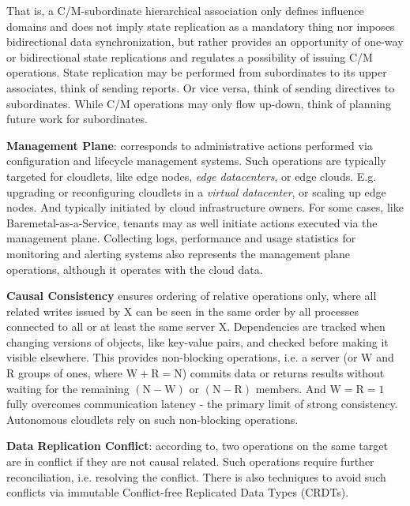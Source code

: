 \documentclass[conference]{IEEEtran}
\begin{document}
That is, a C/M-subordinate hierarchical association only defines influence
domains and does not imply state replication as a mandatory thing nor imposes
bidirectional data synchronization, but rather provides an opportunity of
one-way or bidirectional state replications and regulates a possibility of
issuing C/M operations. State replication may be performed from subordinates to
its upper associates, think of sending reports. Or vice versa, think of sending
directives to subordinates. While C/M operations may only flow up-down, think
of planning future work for subordinates.

\textbf{Management Plane}: corresponds to administrative actions performed via
configuration and lifecycle management systems. Such operations are typically
targeted for cloudlets, like edge nodes, \textit{edge datacenters}\cite{b3},
or edge clouds. E.g. upgrading or reconfiguring cloudlets in a \textit{virtual
datacenter}\cite{b3}, or scaling up edge nodes. And typically initiated by
cloud infrastructure owners. For some cases, like Baremetal-as-a-Service,
tenants may as well initiate actions executed via the management plane.
Collecting logs, performance and usage statistics for monitoring and alerting
systems also represents the management plane operations, although it operates
with the cloud data.

\textbf{Causal Consistency}\cite{b6} ensures ordering of relative operations
only, where all related writes issued by $\mathrm{X}$ can be seen in the same
order by all processes connected to all or at least the same server
$\mathrm{X}$. Dependencies are tracked when changing versions of objects, like
key-value pairs, and checked before making it visible elsewhere. This provides
non-blocking operations, i.e. a server (or $\mathrm{W}$ and $\mathrm{R}$ groups
of ones, where $\mathrm{W + R = N}$) commits data or returns results without
waiting for the remaining $\mathrm{(N - W)}$ or $\mathrm{(N - R)}$ members. And
$\mathrm{W = R = 1}$ fully overcomes communication latency - the primary limit
of strong consistency. Autonomous cloudlets rely on such non-blocking
operations.

\textbf{Data Replication Conflict}: according to\cite{b1}, two operations on
the same target are in conflict if they are not causal related. Such
operations require further reconciliation, i.e. resolving the conflict. There is
also techniques to avoid such conflicts via immutable Conflict-free Replicated
Data Types (CRDTs).
\end{document}
